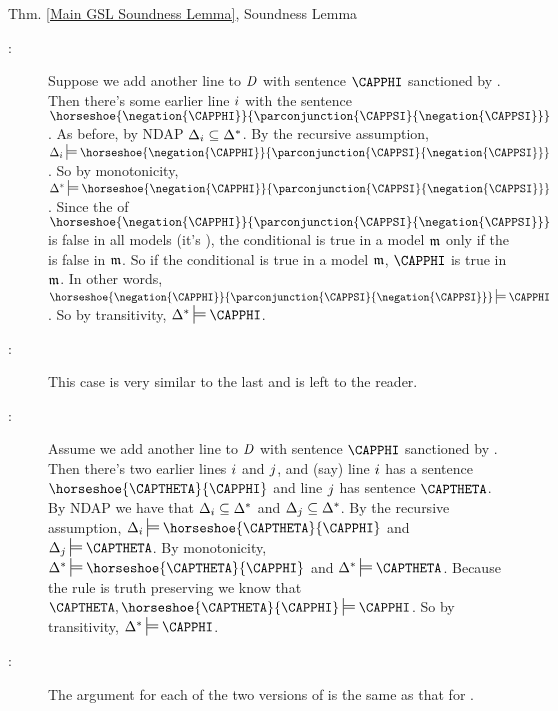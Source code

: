 \begin{PROOFOF}{Thm. \ref{Main GSL Soundness Lemma}, Soundness Lemma}
\begin{description}
\begin{description}
\item[:] 
Suppose we add another line to $\mathit{D}$ with sentence $\CAPPHI$ sanctioned by .
Then there's some earlier line $i$ with the sentence $\horseshoe{\negation{\CAPPHI}}{\parconjunction{\CAPPSI}{\negation{\CAPPSI}}}$.
As before, by NDAP $\Delta_{i}\subseteq\Delta^*$.
By the recursive assumption, $\Delta_{\integer{i}}\sdtstile{}{}\horseshoe{\negation{\CAPPHI}}{\parconjunction{\CAPPSI}{\negation{\CAPPSI}}}$.
So by monotonicity, $\Delta^*\sdtstile{}{}\horseshoe{\negation{\CAPPHI}}{\parconjunction{\CAPPSI}{\negation{\CAPPSI}}}$.
Since the  of $\horseshoe{\negation{\CAPPHI}}{\parconjunction{\CAPPSI}{\negation{\CAPPSI}}}$ is false in all models (it's ), the conditional is true in a model $\mathfrak{m}{}$ only if the  is false in $\mathfrak{m}{}$.
So if the conditional is true in a model $\mathfrak{m}{}$, $\CAPPHI$ is true in $\mathfrak{m}{}$.
In other words, $\horseshoe{\negation{\CAPPHI}}{\parconjunction{\CAPPSI}{\negation{\CAPPSI}}}\sdtstile{}{}\CAPPHI$. 
So by transitivity, $\Delta^*\sdtstile{}{}\CAPPHI$.

\item[:] 
This case is very similar to the last and is left to the reader. 

\item[:]
Assume we add another line to $\mathit{D}$ with sentence $\CAPPHI$ sanctioned by .
Then there's two earlier lines $i$ and $j$, and (say) line $i$ has a sentence $\horseshoe{\CAPTHETA}{\CAPPHI}$ and line $j$ has sentence $\CAPTHETA$. 
By NDAP we have that $\Delta_{i}\subseteq\Delta^*$ and $\Delta_{j}\subseteq\Delta^*$.
By the recursive assumption, $\Delta_{\integer{i}}\sdtstile{}{}\horseshoe{\CAPTHETA}{\CAPPHI}$ and $\Delta_{\integer{j}}\sdtstile{}{}\CAPTHETA$.
By monotonicity, 
$\Delta^*\sdtstile{}{}\horseshoe{\CAPTHETA}{\CAPPHI}$ and $\Delta^*\sdtstile{}{}\CAPTHETA$.
Because the rule is truth preserving we know that $\CAPTHETA,\horseshoe{\CAPTHETA}{\CAPPHI}\sdtstile{}{}\CAPPHI$.
So by transitivity, $\Delta^*\sdtstile{}{}\CAPPHI$.

\item[:] The argument for each of the two versions of  is the same as that for .


\end{description}
\end{description}
\end{PROOFOF}

